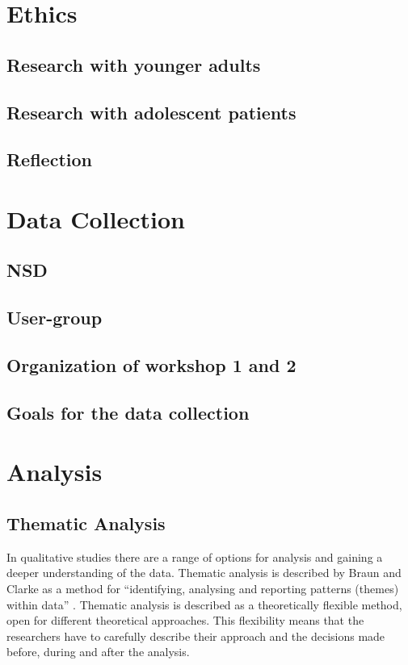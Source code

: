 \documentclass[UKenglish]{uiophd}
\begin{document}
\chapter{Ethics}
	\section{Research with younger adults}
	\section{Research with adolescent patients}
	\section{Reflection}

\chapter{Data Collection}
	\section{NSD}
	\section{User-group}
	\section{Organization of workshop 1 and 2}
	\section{Goals for the data collection}
\chapter{Analysis}

	\section{Thematic Analysis}

		In qualitative studies there are a range of options for analysis and gaining a deeper understanding of the data. Thematic analysis is described by Braun and Clarke as a method for ``identifying, analysing and reporting patterns (themes) within data'' \cite[p.~79]{Braun2006Using}. Thematic analysis is described as a theoretically flexible method, open for different theoretical approaches. This flexibility means that the researchers have to carefully describe their approach and the decisions made before, during and after the analysis. 
\end{document}
